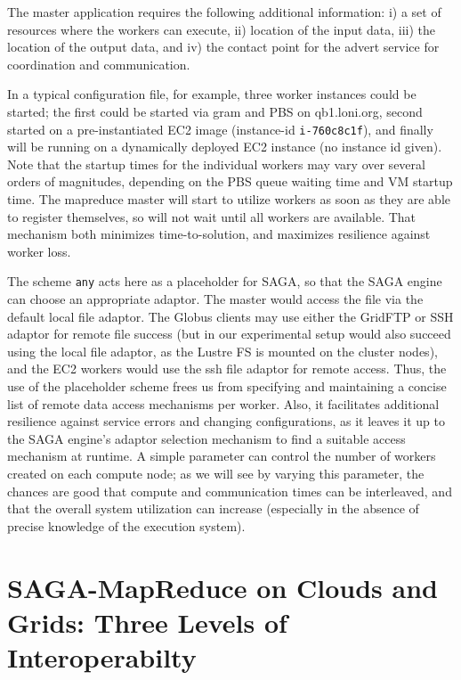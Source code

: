 \documentclass[3p,twocolumn]{elsarticle}
\newcommand{\T}[1]{\texttt{#1}}
\begin{document}
The master application requires the following additional information:
i) a set of resources where the workers can execute, ii) location of
the input data, iii) the location of the output data, and iv) the
contact point for the advert service for coordination and
communication.  

In a typical configuration file, for example, three worker instances
could be started; the first could be started via gram and PBS on
qb1.loni.org, second started on a pre-instantiated EC2 image
(instance-id \T{i-760c8c1f}), and finally will be running on a
dynamically deployed EC2 instance (no instance id given).  Note that
the startup times for the individual workers may vary over several
orders of magnitudes, depending on the PBS queue waiting time and VM
startup time.  The mapreduce master will start to utilize workers as
soon as they are able to register themselves, so will not wait until
all workers are available.  That mechanism both minimizes
time-to-solution, and maximizes resilience against worker loss.

The scheme \T{any} acts here as a placeholder for SAGA, so that the
SAGA engine can choose an appropriate adaptor.  The master would
access the file via the default local file adaptor.  The Globus
clients may use either the GridFTP or SSH adaptor for remote file
success (but in our experimental setup would also succeed 
using the local file adaptor, as the Lustre FS is mounted on the
cluster nodes), and the EC2 workers would use the ssh file adaptor for
remote access.  Thus, the use of the placeholder scheme frees us from
specifying and maintaining a concise list of remote data access
mechanisms per worker.  Also, it facilitates additional resilience
against service errors and changing configurations, as it leaves it up
to the SAGA engine's adaptor selection mechanism to find a suitable
access mechanism at runtime.
A simple parameter can control the number of workers created on each
compute node; as we will see by varying this parameter, the chances
are good that compute and communication times can be interleaved, and
that the overall system utilization can increase (especially in the
absence of precise knowledge of the execution system).
 


\section{SAGA-MapReduce on Clouds and Grids: Three Levels of
  Interoperabilty}
\end{document}
